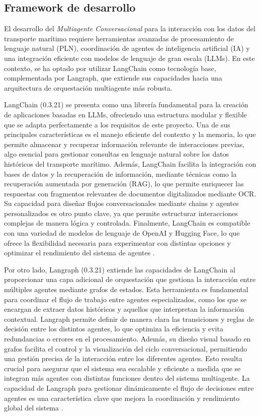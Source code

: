 \subsection{Framework de desarrollo}

El desarrollo del \textit{Multiagente Conversacional} para la interacción con los datos del transporte marítimo requiere herramientas avanzadas de procesamiento de lenguaje natural (PLN), coordinación de agentes de inteligencia artificial (IA) y una integración eficiente con modelos de lenguaje de gran escala (LLMs). En este contexto, se ha optado por utilizar LangChain como tecnología base, complementada por Langraph, que extiende sus capacidades hacia una arquitectura de orquestación multiagente más robusta.

LangChain (0.3.21) se presenta como una librería fundamental para la creación de aplicaciones basadas en LLMs, ofreciendo una estructura modular y flexible que se adapta perfectamente a los requisitos de este proyecto. Una de sus principales características es el manejo eficiente del contexto y la memoria, lo que permite almacenar y recuperar información relevante de interacciones previas, algo esencial para gestionar consultas en lenguaje natural sobre los datos históricos del transporte marítimo. Además, LangChain facilita la integración con bases de datos y la recuperación de información, mediante técnicas como la recuperación aumentada por generación (RAG), lo que permite enriquecer las respuestas con fragmentos relevantes de documentos digitalizados mediante OCR. Su capacidad para diseñar flujos conversacionales mediante chains y agentes personalizados es otro punto clave, ya que permite estructurar interacciones complejas de manera lógica y controlada. Finalmente, LangChain es compatible con una variedad de modelos de lenguaje de OpenAI y Hugging Face, lo que ofrece la flexibilidad necesaria para experimentar con distintas opciones y optimizar el rendimiento del sistema de agentes \cite{langchain2023}.

Por otro lado, Langraph (0.3.21) extiende las capacidades de LangChain al proporcionar una capa adicional de orquestación que gestiona la interacción entre múltiples agentes mediante grafos de estados. Esta herramienta es fundamental para coordinar el flujo de trabajo entre agentes especializados, como los que se encargan de extraer datos históricos y aquellos que interpretan la información contextual. Langraph permite definir de manera clara las transiciones y reglas de decisión entre los distintos agentes, lo que optimiza la eficiencia y evita redundancias o errores en el procesamiento. Además, su diseño visual basado en grafos facilita el control y la visualización del ciclo conversacional, permitiendo una gestión precisa de la interacción entre los diferentes agentes. Esto resulta crucial para asegurar que el sistema sea escalable y eficiente a medida que se integran más agentes con distintas funciones dentro del sistema multiagente. La capacidad de Langraph para gestionar dinámicamente el flujo de decisiones entre agentes es una característica clave que mejora la coordinación y rendimiento global del sistema \cite{langraph2023}.


